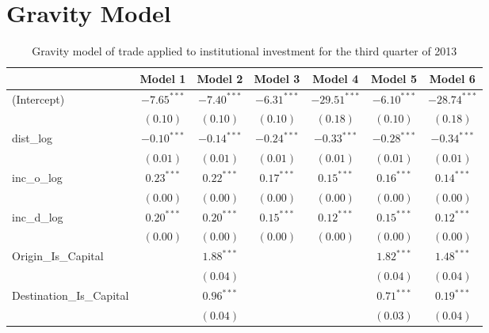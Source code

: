\chapter{Gravity Model}

\label{GravityModelappendix}

\begin{table}
	\small
	\begin{center}
			\caption[CGravity Model of Trade for Q3 2013]{Gravity model of trade applied to institutional investment for the third quarter of 2013}
		
		\begin{tabular}{l c c c c c c }
		\hline
		& Model 1 & Model 2 & Model 3 & Model 4 & Model 5 & Model 6 \\
		\hline
		(Intercept)                  & $-7.65^{***}$ & $-7.40^{***}$ & $-6.31^{***}$ & $-29.51^{***}$ & $-6.10^{***}$ & $-28.74^{***}$ \\
		& $(0.10)$      & $(0.10)$      & $(0.10)$      & $(0.18)$       & $(0.10)$      & $(0.18)$       \\
		dist\_log                    & $-0.10^{***}$ & $-0.14^{***}$ & $-0.24^{***}$ & $-0.33^{***}$  & $-0.28^{***}$ & $-0.34^{***}$  \\
		& $(0.01)$      & $(0.01)$      & $(0.01)$      & $(0.01)$       & $(0.01)$      & $(0.01)$       \\
		inc\_o\_log                  & $0.23^{***}$  & $0.22^{***}$  & $0.17^{***}$  & $0.15^{***}$   & $0.16^{***}$  & $0.14^{***}$   \\
		& $(0.00)$      & $(0.00)$      & $(0.00)$      & $(0.00)$       & $(0.00)$      & $(0.00)$       \\
		inc\_d\_log                  & $0.20^{***}$  & $0.20^{***}$  & $0.15^{***}$  & $0.12^{***}$   & $0.15^{***}$  & $0.12^{***}$   \\
		& $(0.00)$      & $(0.00)$      & $(0.00)$      & $(0.00)$       & $(0.00)$      & $(0.00)$       \\
		Origin\_Is\_Capital          &               & $1.88^{***}$  &               &                & $1.82^{***}$  & $1.48^{***}$   \\
		&               & $(0.04)$      &               &                & $(0.04)$      & $(0.04)$       \\
		Destination\_Is\_Capital     &               & $0.96^{***}$  &               &                & $0.71^{***}$  & $0.19^{***}$   \\
		&               & $(0.04)$      &               &                & $(0.03)$      & $(0.04)$       \\

\end{tabular}
\end{center}
\end{table}
